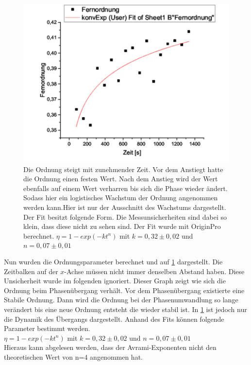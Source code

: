 \documentclass[
	a4paper,
	12pt,
	pagesize,
	ngerman
]{scrartcl}
\begin{document}
\begin{figure}[h!]
    \centering
    \includegraphics[scale = 0.7]{fit.png}
    \caption{Die Ordnung steigt mit zunehmender Zeit. Vor dem Anstiegt hatte die Ordnung einen festen Wert. Nach dem Anstieg wird der Wert  ebenfalls auf einem Wert verharren bis sich die Phase wieder ändert. Sodass hier ein logistisches Wachstum der Ordnung angenommen werden kann.Hier ist nur der Ausschnitt des Wachstums dargestellt. Der Fit besitzt folgende Form. Die Messunsicherheiten sind dabei so klein, dass diese nicht zu sehen sind. Der Fit wurde mit OriginPro berechnet.
    $\eta = 1 - exp(-kt^n)$ mit $k=0,32 \pm 0,02$ und $n=0,07 \pm 0,01$}
    \label{A5}
\end{figure}

Nun wurden die Ordnungsparameter berechnet und auf \cref{A5} dargestellt. Die Zeitbalken auf der $x$-Achse müssen nicht immer denselben Abstand haben. Diese Unsicherheit wurde im folgenden ignoriert. Dieser Graph zeigt wie sich die Ordnung beim Phasenübergang verhält. Vor dem Phasenübergang existierte eine Stabile Ordnung. Dann wird die Ordnung bei der Phasenumwandlung so lange verändert bis eine neue Ordnung entsteht die wieder stabil ist. In \cref{A5} ist jedoch nur die Dynamik des Übergangs dargestellt. Anhand des Fits können folgende Parameter bestimmt werden. \\
$\eta = 1 - exp(-kt^n)$ mit $k=0,32 \pm 0,02$ und $n=0,07 \pm 0,01$\\
Hieraus kann abgelesen werden, dass der Avrami-Exponenten nicht den theoretischen Wert von n=4 angenommen hat.
\end{document}
